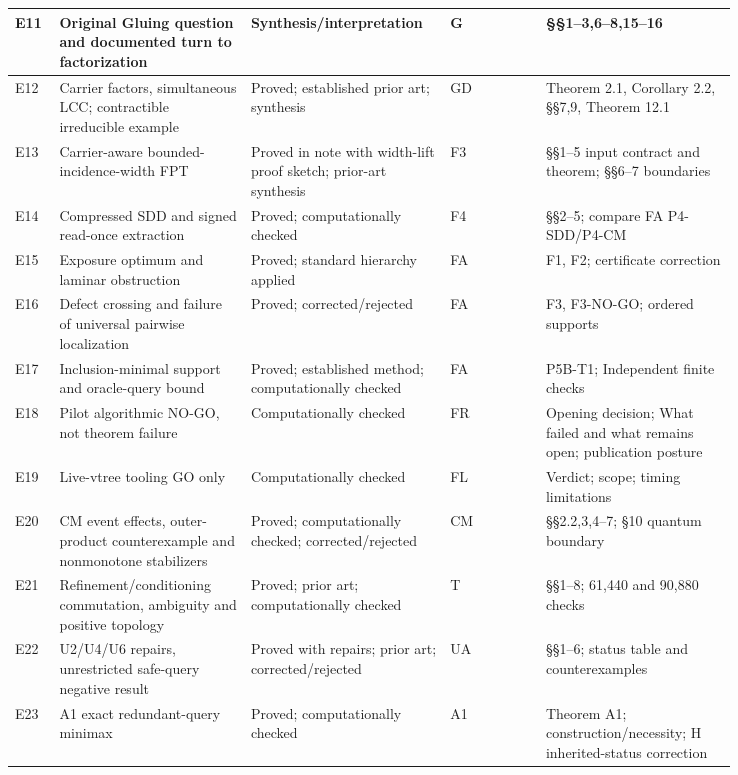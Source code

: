 \documentclass[10pt,letterpaper]{article}
\begin{document}
\begin{longtable}{@{}P{0.050\linewidth}P{0.246\linewidth}P{0.180\linewidth}P{0.123\linewidth}P{0.245\linewidth}@{}}
E11 & Original Gluing question and documented turn to factorization & Synthesis/interpretation & G & \S{}\S{}1--3,6--8,15--16 \\ \hline
E12 & Carrier factors, simultaneous LCC; contractible irreducible example & Proved; established prior art; synthesis & GD & Theorem 2.1, Corollary 2.2, \S{}\S{}7,9, Theorem 12.1 \\ \hline
E13 & Carrier-aware bounded-incidence-width FPT & Proved in note with width-lift proof sketch; prior-art synthesis & F3 & \S{}\S{}1--5 input contract and theorem; \S{}\S{}6--7 boundaries \\ \hline
E14 & Compressed SDD and signed read-once extraction & Proved; computationally checked & F4 & \S{}\S{}2--5; compare FA P4-SDD/P4-CM \\ \hline
E15 & Exposure optimum and laminar obstruction & Proved; standard hierarchy applied & FA & F1, F2; certificate correction \\ \hline
E16 & Defect crossing and failure of universal pairwise localization & Proved; corrected/rejected & FA & F3, F3-NO-GO; ordered supports \\ \hline
E17 & Inclusion-minimal support and oracle-query bound & Proved; established method; computationally checked & FA & P5B-T1; Independent finite checks \\ \hline
E18 & Pilot algorithmic NO-GO, not theorem failure & Computationally checked & FR & Opening decision; What failed and what remains open; publication posture \\ \hline
E19 & Live-vtree tooling GO only & Computationally checked & FL & Verdict; scope; timing limitations \\ \hline
E20 & CM event effects, outer-product counterexample and nonmonotone stabilizers & Proved; computationally checked; corrected/rejected & CM & \S{}\S{}2.2,3,4--7; \S{}10 quantum boundary \\ \hline
E21 & Refinement/conditioning commutation, ambiguity and positive topology & Proved; prior art; computationally checked & T & \S{}\S{}1--8; 61,440 and 90,880 checks \\ \hline
E22 & U2/U4/U6 repairs, unrestricted safe-query negative result & Proved with repairs; prior art; corrected/rejected & UA & \S{}\S{}1--6; status table and counterexamples \\ \hline
E23 & A1 exact redundant-query minimax & Proved; computationally checked & A1 & Theorem A1; construction/necessity; H inherited-status correction \\ \hline

\end{longtable}
\end{document}
